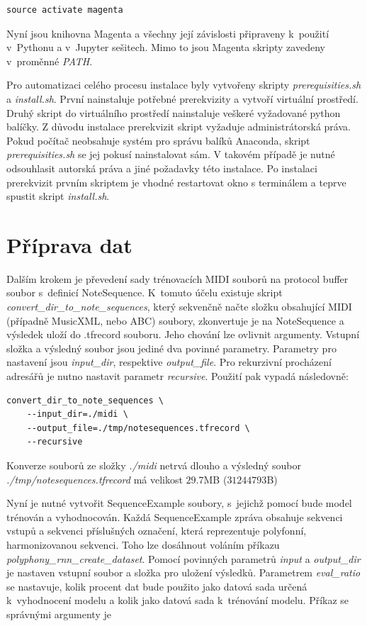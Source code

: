\begin{verbatim}
source activate magenta
\end{verbatim}
Nyní jsou knihovna Magenta a všechny její závislosti 
připraveny k~použití v~Pythonu a v~Jupyter sešitech.
Mimo to jsou Magenta skripty zavedeny v~proměnné \emph{PATH}.
\cite{google_git_polyphony}
\par

Pro automatizaci celého procesu instalace byly vytvořeny skripty 
\emph{prerequisities.sh} a \emph{install.sh}.
První nainstaluje potřebné prerekvizity a
vytvoří virtuální prostředí.
Druhý skript do virtuálního prostředí nainstaluje veškeré vyžadované python balíčky.
Z důvodu instalace prerekvizit skript vyžaduje administrátorská práva.
Pokud počítač neobsahuje systém pro správu balíků Anaconda,
skript \emph{prerequisities.sh} se jej pokusí nainstalovat sám.
V takovém případě je nutné odsouhlasit autorská práva 
a jiné požadavky této instalace.
Po instalaci prerekvizit prvním skriptem je vhodné restartovat okno s terminálem
a teprve spustit skript \emph{install.sh}.

\section{Příprava dat}
Dalším krokem je převedení sady trénovacích MIDI souborů na protocol buffer soubor
s~definicí NoteSequence.
K~tomuto účelu existuje skript \emph{convert\_dir\_to\_note\_sequences}, 
který sekvenčně načte složku obsahující MIDI (případně MusicXML, nebo ABC) soubory,
zkonvertuje je na NoteSequence a výsledek uloží do .tfrecord souboru.
Jeho chování lze ovlivnit argumenty.
Vstupní složka a výsledný soubor jsou jediné dva povinné parametry.
Parametry pro nastavení jsou \emph{input\_dir}, respektive \emph{output\_file}.
Pro rekurzivní procházení adresářů je nutno nastavit parametr \emph{recursive}.
\cite{google_git_polyphony}
Použití  pak vypadá následovně:

\begin{verbatim}
convert_dir_to_note_sequences \
    --input_dir=./midi \
    --output_file=./tmp/notesequences.tfrecord \
    --recursive
\end{verbatim} 
Konverze souborů ze složky \emph{./midi} netrvá dlouho
a výsledný soubor \emph{./tmp/notesequences.tfrecord}
má velikost $29.7$MB ($31244793$B)
\par

Nyní je nutné vytvořit SequenceExample soubory,
s~jejichž pomocí bude model trénován a vyhodnocován.
Každá SequenceExample zpráva obsahuje sekvenci vstupů a
sekvenci příslušných označení, 
která reprezentuje polyfonní, harmonizovanou sekvenci.
Toho lze dosáhnout voláním příkazu \emph{polyphony\_rnn\_create\_dataset}.
Pomocí povinných parametrů \emph{input} a \emph{output\_dir} 
je nastaven vstupní soubor a složka pro uložení výsledků.
Parametrem \emph{eval\_ratio} se nastavuje, kolik procent dat 
bude použito jako datová sada určená k~vyhodnocení modelu
a kolik jako datová sada k~trénování modelu.
\cite{google_git_polyphony}
Příkaz se správnými argumenty je

